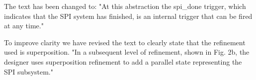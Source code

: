 \documentclass{response}
\begin{document}
\begin{comment}{Reviewer \#3}

  * Mid:

  "At this abstraction the spi_done triggered, which ..."
  ->
  " At this abstraction there is only one event, spi_done, which ..."
\end{comment}

\begin{response}
  The text has been changed to: "At this abstraction the spi\_done trigger, which indicates that the SPI system has finished, is an internal trigger that can be fired at any time."
\end{response}

\begin{comment}{Reviewer \#3}
  * Line -9: "on an Idle state" -> "in an Idle state".
\end{comment}

\begin{response}
\end{response}

\begin{comment}{Reviewer \#3}
* Line -6: "while SPI subsystem ..." -> "while the SPI subsystem ..."
\end{comment}

\begin{response}
\end{response}

\begin{comment}{Reviewer \#3}
  Page 6:

  * Figure 2: this looks like a way of modeling event refinement,
  which seems different from state refinement. Perhaps comment on
  this.
\end{comment}

\begin{response}
  To improve clarity we have revised the text to clearly state that 
  the refinement used is superposition. "In a subsequent level of refinement, shown in Fig. 2b, the designer uses superposition refinement to add a parallel state representing the SPI subsystem."
\end{response}

\begin{comment}{Reviewer \#3}
  * Line -7: "This safety property is introduced ..." : where, when?
\end{comment}
\end{document}

